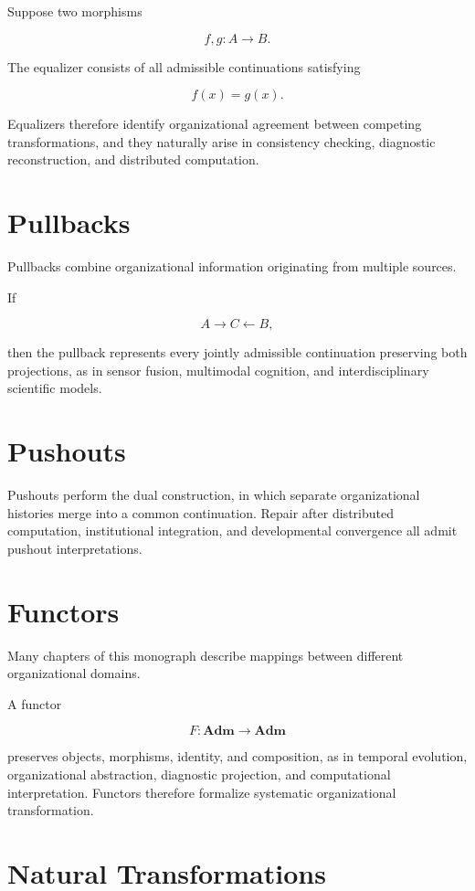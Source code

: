 \documentclass[11pt,oneside]{book}
\numberwithin{equation}{chapter}
\theoremstyle{definition}
\theoremstyle{plain}
\begin{document}
Suppose two morphisms

\[
f,g
:
A
\rightarrow
B.
\]

The equalizer consists of all admissible continuations satisfying

\[
f(x)
=
g(x).
\]

Equalizers therefore identify organizational agreement between competing transformations, and they naturally arise in consistency checking, diagnostic reconstruction, and distributed computation.

\section{Pullbacks}

Pullbacks combine organizational information originating from multiple
sources.

If

\[
A
\rightarrow
C
\leftarrow
B,
\]

then the pullback represents every jointly admissible continuation preserving both projections, as in sensor fusion, multimodal cognition, and interdisciplinary scientific models.

\section{Pushouts}

Pushouts perform the dual construction, in which separate organizational histories merge into a common continuation. Repair after distributed computation, institutional integration, and developmental convergence all admit pushout interpretations.

\section{Functors}

Many chapters of this monograph describe mappings between different
organizational domains.

A functor

\[
F
:
\mathbf{Adm}
\rightarrow
\mathbf{Adm}
\]

preserves objects, morphisms, identity, and composition, as in temporal evolution, organizational abstraction, diagnostic projection, and computational interpretation. Functors therefore formalize systematic organizational transformation.

\section{Natural Transformations}
\end{document}

